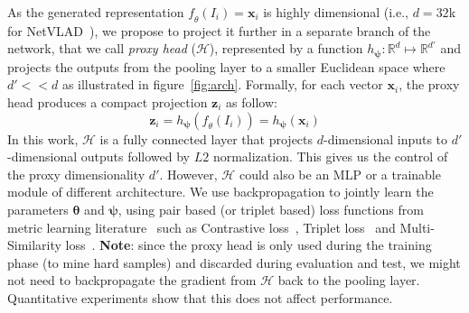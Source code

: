 \documentclass{bmvc2k}
\begin{document}
As the generated representation $\mathit{f_{\theta}}\left(I_i\right) = \mathbf{x}_i$ is highly dimensional (i.e., $d = 32$k for NetVLAD~\cite{arandjelovic2016netvlad}), we propose to project it further in a separate branch of the network, that we call \textit{proxy head} ($\mathcal{H}$), represented by a function $\mathit{h_{\mathbf{\psi}}} : \mathbb{R}^{d} \mapsto \mathbb{R}^{d'}$ and projects the outputs from the pooling layer to a smaller Euclidean space where $d' << d$ as illustrated in figure~\ref{fig:arch}. Formally, for each  vector $\mathbf{x}_i$, the proxy head produces a compact projection $\mathbf{z}_i$ as follow:
\begin{equation}\label{eq1}
\mathbf{z}_i  = \mathit{h_{\mathbf{\psi}}} \left(  \mathit{f_{\theta}}\left(I_i\right) \right) 
     =  \mathit{h_{\mathbf{\psi}}} \left(   \mathbf{x}_i \right)
\end{equation}
In this work, $\mathcal{H}$ is a fully connected layer that projects $d$-dimensional inputs to $d'$-dimensional outputs followed by $L2$ normalization. This gives us  the control of the proxy dimensionality $d'$. However, $\mathcal{H}$ could also be an MLP or a trainable module of different architecture.
We use backpropagation to jointly learn the parameters $\mathbf{\theta}$ and $\mathbf{\psi}$, using pair based (or triplet based) loss functions from metric learning literature~\cite{musgrave2020metric} such as Contrastive loss~\cite{hadsell2006dimensionality}, Triplet loss~\cite{hermans2017defense} and Multi-Similarity loss~\cite{wang2019multi}. \textbf{Note}: since the proxy head is only used during the training phase (to mine hard samples) and discarded during evaluation and test, we might not need to backpropagate the gradient from $\mathcal{H}$ back to the pooling layer. Quantitative experiments show that this does not affect performance.
\end{document}

